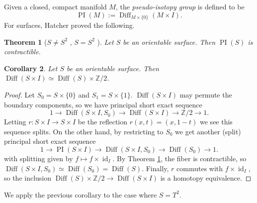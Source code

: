 \documentclass{amsart}
\theoremstyle{plain}
\newtheorem{thm}{Theorem}[section]
\newtheorem{cor}[thm]{Corollary}
\theoremstyle{definition}
\DeclareMathOperator\Diff{Diff}
\DeclareMathOperator{\PI}{PI}
\DeclareMathOperator{\id}{id}
\newcommand{\Z}{\mathbb{Z}}
\begin{document}
Given a closed, compact manifold $M$,  the \emph{pseudo-isotopy group} is defined to be \[\PI(M) := \Diff_{M\times \{0\}}(M\times I).\] For surfaces, Hatcher proved the following.

\begin{thm}[$S\neq S^2$ \cite{Hatcher76}, $S=S^2$ \cite{Hatcher}]\label{thm:Pseudo-Isotopy-Surfaces}Let $S$ be an orientable surface.  Then $\PI(S)$ is contractible.
\end{thm}

\begin{cor}\label{cor:I-bundle-Diff}
    Let $S$ be an orientable surface.  Then $\Diff(S\times I)\simeq \Diff(S)\times \Z/2$.
\end{cor}
\begin{proof} 
Let $S_0=S\times \{0\}$ and $S_1=S\times \{1\}$. $\Diff(S\times I)$ may permute the boundary components, so we have principal short exact sequence 
\[1\rightarrow \Diff(S\times I,S_0)\rightarrow \Diff(S\times I)\rightarrow \Z/2\rightarrow 1.\] 
Letting $r\colon S\times I\rightarrow S\times I$ be the reflection $r(x,t)=(x,1-t)$ we see this sequence splits. On the other hand, by restricting to $S_0$ we get another (split) principal short exact sequence 
\[1\rightarrow \PI(S\times I)\rightarrow \Diff(S\times I, S_0)\rightarrow \Diff(S_0)\rightarrow 1.\]  
with splitting given by 
$f\mapsto f \times \id_I$.
By Theorem \ref{thm:Pseudo-Isotopy-Surfaces}, the fiber is contractible, so $\Diff(S\times I,S_0)\simeq \Diff(S_0)=\Diff(S)$. 
Finally, $r$ commutes with $f\times \id_I$, so the inclusion $\Diff(S)\times \Z/2\rightarrow \Diff(S\times I)$ is a homotopy equivalence. 
\end{proof}

We apply the previous corollary to the case where $S=T^2$.
\end{document}
